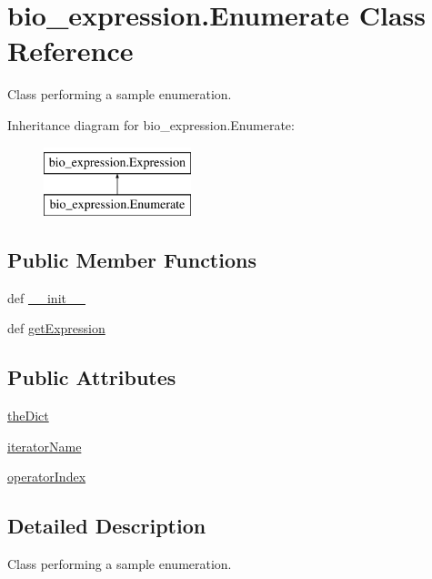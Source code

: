 \hypertarget{classbio__expression_1_1_enumerate}{\section{bio\+\_\+expression.\+Enumerate Class Reference}
\label{classbio__expression_1_1_enumerate}
}


Class performing a sample enumeration.  


Inheritance diagram for bio\+\_\+expression.\+Enumerate\+:\begin{figure}[H]
\begin{center}
\leavevmode
\includegraphics[height=2.000000cm]{d7/d74/classbio__expression_1_1_enumerate}
\end{center}
\end{figure}
\subsection*{Public Member Functions}
\begin{DoxyCompactItemize}
\item 
def \hyperlink{classbio__expression_1_1_enumerate_ab7cd2488a92f201b862e15beb632e73f}{\+\_\+\+\_\+init\+\_\+\+\_\+}
\item 
def \hyperlink{classbio__expression_1_1_enumerate_acbbe6290ed6808c1e8673b55131d9a92}{get\+Expression}
\end{DoxyCompactItemize}
\subsection*{Public Attributes}
\begin{DoxyCompactItemize}
\item 
\hyperlink{classbio__expression_1_1_enumerate_a073ebe902289aa7fc272670590867337}{the\+Dict}
\item 
\hyperlink{classbio__expression_1_1_enumerate_a1674f2a07f9b8955d89cdf3be608b385}{iterator\+Name}
\item 
\hyperlink{classbio__expression_1_1_enumerate_a4383c04f076c1aeb5bc2a60a9932f619}{operator\+Index}
\end{DoxyCompactItemize}


\subsection{Detailed Description}
Class performing a sample enumeration. 

